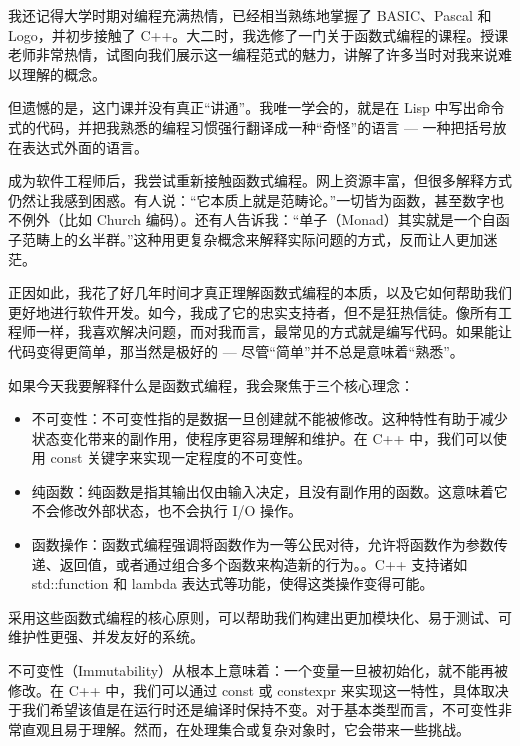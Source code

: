 
我还记得大学时期对编程充满热情，已经相当熟练地掌握了 BASIC、Pascal 和 Logo，并初步接触了 C++。大二时，我选修了一门关于函数式编程的课程。授课老师非常热情，试图向我们展示这一编程范式的魅力，讲解了许多当时对我来说难以理解的概念。

但遗憾的是，这门课并没有真正“讲通”。我唯一学会的，就是在 Lisp 中写出命令式的代码，并把我熟悉的编程习惯强行翻译成一种“奇怪”的语言 --- 一种把括号放在表达式外面的语言。

成为软件工程师后，我尝试重新接触函数式编程。网上资源丰富，但很多解释方式仍然让我感到困惑。有人说：“它本质上就是范畴论。”一切皆为函数，甚至数字也不例外（比如 Church 编码）。还有人告诉我：“单子（Monad）其实就是一个自函子范畴上的幺半群。”这种用更复杂概念来解释实际问题的方式，反而让人更加迷茫。

正因如此，我花了好几年时间才真正理解函数式编程的本质，以及它如何帮助我们更好地进行软件开发。如今，我成了它的忠实支持者，但不是狂热信徒。像所有工程师一样，我喜欢解决问题，而对我而言，最常见的方式就是编写代码。如果能让代码变得更简单，那当然是极好的 --- 尽管“简单”并不总是意味着“熟悉”。

如果今天我要解释什么是函数式编程，我会聚焦于三个核心理念： 

\begin{itemize}
\item 
不可变性：不可变性指的是数据一旦创建就不能被修改。这种特性有助于减少状态变化带来的副作用，使程序更容易理解和维护。在 C++ 中，我们可以使用 const 关键字来实现一定程度的不可变性。

\item 
纯函数：纯函数是指其输出仅由输入决定，且没有副作用的函数。这意味着它不会修改外部状态，也不会执行 I/O 操作。

\item 
函数操作：函数式编程强调将函数作为一等公民对待，允许将函数作为参数传递、返回值，或者通过组合多个函数来构造新的行为。。C++ 支持诸如 std::function 和 lambda 表达式等功能，使得这类操作变得可能。 
\end{itemize}

采用这些函数式编程的核心原则，可以帮助我们构建出更加模块化、易于测试、可维护性更强、并发友好的系统。


不可变性（Immutability）从根本上意味着：一个变量一旦被初始化，就不能再被修改。在 C++ 中，我们可以通过 const 或 constexpr 来实现这一特性，具体取决于我们希望该值是在运行时还是编译时保持不变。对于基本类型而言，不可变性非常直观且易于理解。然而，在处理集合或复杂对象时，它会带来一些挑战。

